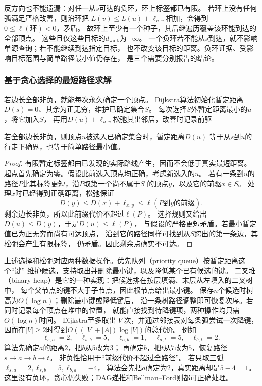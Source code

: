 反方向也不能遗漏：对任一从\(s\)可达的负环，环上标签都已有限。
若环上没有任何弧满足严格改善，则沿环把
\(L(v)\leq L(u)+\ell_{u,v}\)相加，会得到\(0\leq\ell(\text{环})<0\)，矛盾。
故环上至少有一个种子，其后继遍历覆盖该环能到达的全部顶点。
这些且仅这些目标的\(d_{\mathrm{walk}}\)为\(-\infty\)。
一个负环若不能从\(s\)到达，就不影响单源查询；若不能继续到达指定目标，
也不改变该目标的距离。负环证据、受影响目标范围与简单路径最小值仍存在，
是三个需要分别报告的结论。

\subsubsection{基于贪心选择的最短路径求解}

若边长全部非负，就能每次永久确定一个顶点。
Dijkstra算法初始化暂定距离\(D(s)=0\)、其余为正无穷，维护已确定集合\(S\)。
每次选择\(S\)外暂定距离最小的\(u\)，将它加入\(S\)，
再用\(D(u)+\ell_{u,v}\)松弛其出邻居，改善时记录前驱

\begin{theorem}[Dijkstra算法的贪心正确性]
  \label{thm:graph-theory-dijkstra-correctness}
  若全部边长非负，则顶点\(u\)被选入已确定集合时，暂定距离\(D(u)\)
  等于从\(s\)到\(u\)的行走下确界，也等于简单路径最小值。
\end{theorem}

\begin{proof}
有限暂定标签都由已发现的实际路线产生，因而不会低于真实最短距离。
起点首先确定为零。假设此前选入顶点均正确，考虑新选入的\(u\)。
若有一条到\(u\)的路径\(P\)比其标签更短，沿\(P\)取第一个尚不属于\(S\)
的顶点\(y\)，以及它的前驱\(x\in S\)。
处理\(x\)时已经得到正确距离，松弛保证
\[
  D(y)\leq D(x)+\ell_{x,y}
  \leq \ell(P\text{到}y\text{的前缀}).
\]
剩余边长非负，所以此前缀代价不超过\(\ell(P)\)。
选择规则又给出\(D(u)\leq D(y)\)，于是\(D(u)\leq\ell(P)\)，
与假设的严格更短矛盾。若最小暂定值已为正无穷而尚有可达顶点，
沿到它的路径同样可找到从\(S\)跨出的第一条边，其松弛会产生有限标签，
仍矛盾。因此剩余点确实不可达。
\end{proof}

上述选择和松弛对应两种数据操作。优先队列（priority queue）按暂定距离这个“键”
维护候选，支持取出并删除最小键，以及降低某个已有候选的键。
二叉堆（binary heap）是它的一种实现：把候选排在按层填满、末层从左填入的二叉树中，
每个父节点的键不大于子节点，因此根节点给出最小键。
保存\(n\)个候选时树高为\(O(\log n)\)；删除最小键或降低键后，
沿一条树路径调整即可恢复次序。若同时记录每个顶点在堆中的位置，
就能直接找到待降键项，两种操作均只需\(O(\log n)\)时间。
Dijkstra至多取出\(|V|\)次，并通过邻接表对每条弧尝试一次降键，
因而在\(|V|\geq2\)时得到\(O((|V|+|A|)\log|V|)\)的总代价。
例如
\[
  \ell_{s,a}=2,\quad\ell_{s,b}=5,\quad\ell_{a,b}=1,\quad
  \ell_{a,t}=5,\quad\ell_{b,t}=2.
\]
算法先确定\(a\)的距离\(2\)，把\(b\)从\(5\)改为\(3\)；
再确定\(b\)，把\(t\)从\(7\)改为\(5\)，恢复路径\(s\to a\to b\to t\)。
非负性恰用于“前缀代价不超过全路径”。
若只取三弧\(\ell_{s,a}=2,\ell_{s,b}=5,\ell_{b,a}=-4\)，
算法会先把\(a\)确定为\(2\)，真实距离却是\(5-4=1\)。
这里没有负环，贪心仍失败；DAG递推和Bellman--Ford则都可正确处理。

